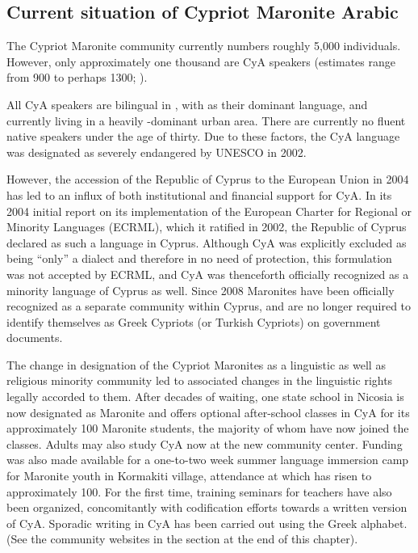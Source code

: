 \documentclass[output=paper]{langsci/langscibook}
\begin{document}
\subsection{Current situation of Cypriot Maronite Arabic}
The Cypriot Maronite community currently numbers roughly 5,000 individuals. However, only approximately one thousand are CyA speakers (estimates range from 900 to perhaps 1300; \citealt{CouncilofEurope2017}).


All CyA speakers are bilingual in , with  as their dominant language, and currently living in a heavily -dominant urban area. There are currently no fluent native speakers under the age of thirty. Due to these factors, the CyA language was designated as severely {endangered} by UNESCO in 2002.

However, the accession of the Republic of {Cyprus} to the {European Union} in 2004 has led to an influx of both institutional and financial support for CyA. In its 2004 initial report on its implementation of the European Charter for Regional or Minority Languages (ECRML), which it ratified in 2002, the Republic of {Cyprus} declared  as such a language in {Cyprus}. Although CyA was explicitly excluded as being “only” a dialect and therefore in no need of protection, this formulation was not accepted by ECRML, and CyA was thenceforth officially recognized as a minority language of {Cyprus} as well. Since 2008 Maronites have been officially recognized as a separate community within {Cyprus}, and are no longer required to identify themselves as Greek Cypriots (or Turkish Cypriots) on government documents.

The change in designation of the Cypriot Maronites as a linguistic as well as religious minority community led to associated changes in the linguistic rights legally accorded to them. After decades of waiting, one state school in Nicosia is now designated as Maronite and offers optional after-school classes in CyA for its approximately 100 Maronite students, the majority of whom have now joined the classes. Adults may also study CyA now at the new community center. Funding was also made available for a one-to-two week summer language immersion camp for Maronite youth in {Kormakiti} village, attendance at which has risen to approximately 100. For the first time, training seminars for teachers have also been organized, concomitantly with codification efforts towards a written version of CyA. Sporadic writing in CyA has been carried out using the Greek alphabet. (See the community websites in the  section at the end of this chapter).
\end{document}

